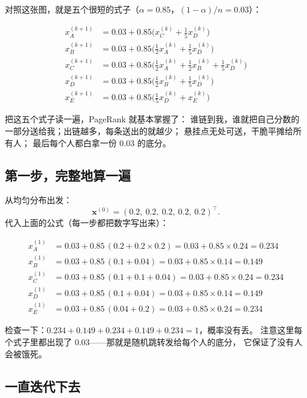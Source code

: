 \documentclass[UTF8,11pt,fontset=macnew]{ctexart}
\newcommand{\xv}{\mathbf{x}}
\begin{document}
对照这张图，就是五个很短的式子（$\alpha=0.85$，$(1-\alpha)/n=0.03$）：

\begin{align*}
x_A^{(k+1)} &= 0.03 + 0.85\Big(x_C^{(k)} + \tfrac15 x_D^{(k)}\Big)\\[0.5mm]
x_B^{(k+1)} &= 0.03 + 0.85\Big(\tfrac12 x_A^{(k)} + \tfrac15 x_D^{(k)}\Big)\\[0.5mm]
x_C^{(k+1)} &= 0.03 + 0.85\Big(\tfrac12 x_A^{(k)} + \tfrac12 x_B^{(k)} + \tfrac15 x_D^{(k)}\Big)\\[0.5mm]
x_D^{(k+1)} &= 0.03 + 0.85\Big(\tfrac12 x_B^{(k)} + \tfrac15 x_D^{(k)}\Big)\\[0.5mm]
x_E^{(k+1)} &= 0.03 + 0.85\Big(\tfrac15 x_D^{(k)} + x_E^{(k)}\Big)
\end{align*}

把这五个式子读一遍，PageRank 就基本掌握了：
谁链到我，谁就把自己分数的一部分送给我；出链越多，每条送出的就越少；
悬挂点无处可送，干脆平摊给所有人；
最后每个人都白拿一份 $0.03$ 的底分。

\subsection{第一步，完整地算一遍}

从均匀分布出发：
\[
\xv^{(0)}=(0.2,\ 0.2,\ 0.2,\ 0.2,\ 0.2)^\top .
\]
代入上面的公式（每一步都把数字写出来）：

\begin{align*}
x_A^{(1)} &= 0.03 + 0.85\,(0.2 + 0.2\times 0.2)
           = 0.03 + 0.85\times 0.24 = \mathbf{0.234}\\
x_B^{(1)} &= 0.03 + 0.85\,(0.1 + 0.04)
           = 0.03 + 0.85\times 0.14 = \mathbf{0.149}\\
x_C^{(1)} &= 0.03 + 0.85\,(0.1 + 0.1 + 0.04)
           = 0.03 + 0.85\times 0.24 = \mathbf{0.234}\\
x_D^{(1)} &= 0.03 + 0.85\,(0.1 + 0.04)
           = 0.03 + 0.85\times 0.14 = \mathbf{0.149}\\
x_E^{(1)} &= 0.03 + 0.85\,(0.04 + 0.2)
           = 0.03 + 0.85\times 0.24 = \mathbf{0.234}
\end{align*}

检查一下：$0.234+0.149+0.234+0.149+0.234=1$，概率没有丢。
注意这里每个式子里都出现了 $0.03$——那就是随机跳转发给每个人的底分，
它保证了没有人会被饿死。

\subsection{一直迭代下去}
\end{document}

